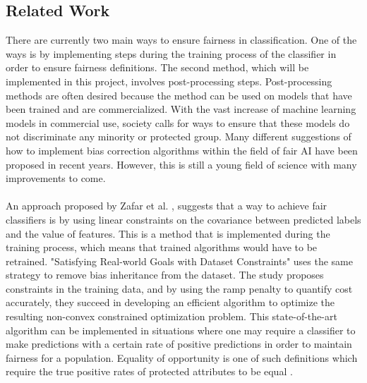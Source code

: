 \documentclass[11pt, fleqn, titlepage]{article}
\begin{document}
	
	\subsection{Related Work}
	There are currently two main ways to ensure fairness in classification. One of the ways is by implementing steps during the training process of the classifier in order to ensure fairness definitions. The second method, which will be implemented in this project, involves post-processing steps. Post-processing methods are often desired because the method can be used on models that have been trained and are commercialized. With the vast increase of machine learning models in commercial use, society calls for ways to ensure that these models do not discriminate any minority or protected group. Many different suggestions of how to implement bias correction algorithms within the field of fair AI have been proposed in recent years. However, this is still a young field of science with many improvements to come.\\\\
	\noindent
	An approach proposed by Zafar et al. \cite{Zafar}, suggests that a way to achieve fair classifiers is by using linear constraints on the covariance between predicted labels and the value of features. This is a method that is implemented during the training process, which means that trained algorithms would have to be retrained. "Satisfying Real-world Goals with Dataset Constraints" uses the same strategy to remove bias inheritance from the dataset. The study proposes constraints in the training data, and by using the ramp penalty to quantify cost accurately, they succeed in developing an efficient algorithm to optimize the resulting non-convex constrained optimization problem. This state-of-the-art algorithm can be implemented in situations where one may require a classifier to make predictions with a certain rate of positive predictions in order to maintain fairness for a population. Equality of opportunity is one of such definitions which require the true positive rates of protected attributes to be equal \cite{g_goh}. \\
	
\end{document}
